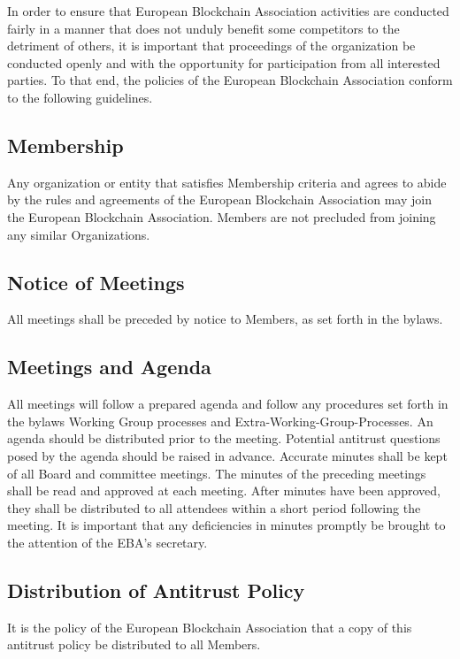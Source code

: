 \documentclass{article}
\begin{document}
In order to ensure that European Blockchain Association activities are conducted fairly in a manner that does not unduly benefit some competitors to the detriment of others, it is important that proceedings of the organization be conducted openly and with the opportunity for participation from all interested parties. 
To that end, the policies of the European Blockchain Association conform to the following guidelines.

\subsection{Membership}

Any organization or entity that satisfies Membership criteria and agrees to abide by the rules and agreements of the European Blockchain Association may join the European Blockchain Association. 
Members are not precluded from joining any similar Organizations.

\subsection{Notice of Meetings}

All meetings shall be preceded by notice to Members, as set forth in the bylaws.

\subsection{Meetings and Agenda}

All meetings will follow a prepared agenda and follow any procedures set forth in the bylaws Working Group processes and Extra-Working-Group-Processes. 
An agenda should be distributed prior to the meeting.
 Potential antitrust questions posed by the agenda should be raised in advance. 
 Accurate minutes shall be kept of all Board and committee meetings. 
 The minutes of the preceding meetings shall be read and approved at each meeting. 
 After minutes have been approved, they shall be distributed to all attendees within a short period following the meeting.
  It is important that any deficiencies in minutes promptly be brought to the attention of the EBA's secretary.

\subsection{Distribution of Antitrust Policy}

It is the policy of the European Blockchain Association that a copy of this antitrust policy be distributed to all Members.
\end{document}
